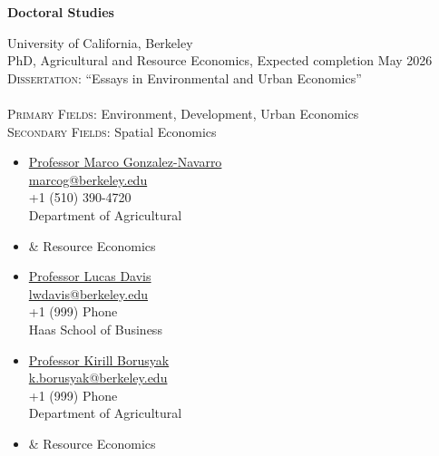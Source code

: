 \documentclass[10pt, oneside]{article}
\begin{document}
\begin{minipage}[t]{0.1\linewidth}
\textbf{Doctoral Studies}
\end{minipage}\hspace{0.05\linewidth}
\begin{minipage}[t]{0.8\linewidth}
University of California, Berkeley\\
PhD, Agricultural and Resource Economics, Expected completion May 2026 \\
\textsc{Dissertation:}  ``Essays in Environmental and Urban Economics'' \\ 
~\\ 
\textsc{Primary Fields:} Environment, Development, Urban Economics \\
\textsc{Secondary Fields:} Spatial Economics \\
\vspace{0.3cm} 

\begin{minipage}[t]{0.4\linewidth}
\begin{itemize}[noitemsep,nolistsep]
\item[] \underline{Professor Marco Gonzalez-Navarro} \\
\href{mailto:marcog@berkeley.edu}{marcog@berkeley.edu} \\ 
+1 (510) 390-4720 \\
Department of Agricultural
\item[] \hspace{4mm} \& Resource Economics \\
\item[] \underline{Professor Lucas Davis} \\
\href{mailto:lwdavis@berkeley.edu}{lwdavis@berkeley.edu} \\
+1 (999) Phone \\
Haas School of Business 
\end{itemize}
\end{minipage}
\begin{minipage}[t]{0.4\linewidth}
\begin{itemize}[noitemsep,nolistsep]
    \item[] \underline{Professor Kirill Borusyak} \\
\href{k.borusyak@berkeley.edu}{k.borusyak@berkeley.edu} \\ 
+1 (999) Phone \\
Department of Agricultural
\item[] \hspace{4mm} \& Resource Economics
\end{itemize}
\end{minipage}
\end{minipage}\vspace{5mm}
\end{document}
